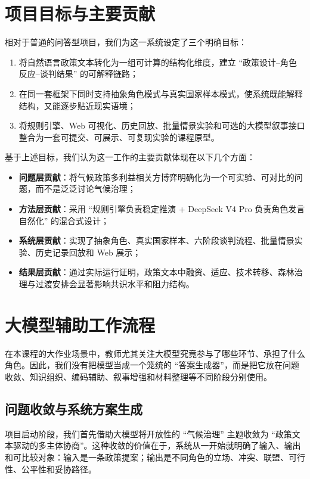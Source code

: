 \documentclass[12pt,a4paper]{ctexart}
\begin{document}
\section{项目目标与主要贡献}
相对于普通的问答型项目，我们为这一系统设定了三个明确目标：
\begin{enumerate}
  \item 将自然语言政策文本转化为一组可计算的结构化维度，建立 ``政策设计--角色反应--谈判结果'' 的可解释链路；
  \item 在同一套框架下同时支持抽象角色模式与真实国家样本模式，使系统既能解释结构，又能逐步贴近现实语境；
  \item 将规则引擎、Web 可视化、历史回放、批量情景实验和可选的大模型叙事接口整合为一套可提交、可展示、可复现实验的课程原型。
\end{enumerate}

基于上述目标，我们认为这一工作的主要贡献体现在以下几个方面：
\begin{itemize}
  \item \textbf{问题层贡献}：将气候政策多利益相关方博弈明确化为一个可实验、可对比的问题，而不是泛泛讨论气候治理；
  \item \textbf{方法层贡献}：采用 ``规则引擎负责稳定推演 + DeepSeek V4 Pro 负责角色发言自然化'' 的混合式设计；
  \item \textbf{系统层贡献}：实现了抽象角色、真实国家样本、六阶段谈判流程、批量情景实验、历史记录回放和 Web 展示；
  \item \textbf{结果层贡献}：通过实际运行证明，政策文本中融资、适应、技术转移、森林治理与过渡安排会显著影响共识水平和阻力结构。
\end{itemize}

\section{大模型辅助工作流程}
在本课程的大作业场景中，教师尤其关注大模型究竟参与了哪些环节、承担了什么角色。因此，我们没有把模型当成一个笼统的 ``答案生成器''，而是把它放在问题收敛、知识组织、编码辅助、叙事增强和材料整理等不同阶段分别使用。

\subsection{问题收敛与系统方案生成}
项目启动阶段，我们首先借助大模型将开放性的 ``气候治理'' 主题收敛为 ``政策文本驱动的多主体协商''。这种收敛的价值在于，系统从一开始就明确了输入、输出和可比较对象：输入是一条政策提案；输出是不同角色的立场、冲突、联盟、可行性、公平性和妥协路径。
\end{document}
